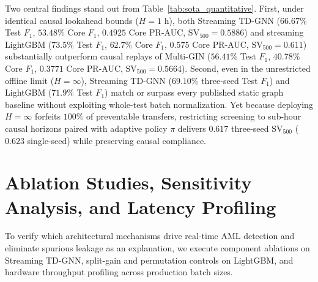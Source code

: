 \documentclass[pdflatex,sn-mathphys,Numbered]{sn-jnl}
\theoremstyle{thmstyleone}
\begin{document}
Two central findings stand out from Table~\ref{tab:sota_quantitative}. First, under identical causal lookahead bounds ($H = 1\text{ h}$), both Streaming TD-GNN ($66.67\%$ Test $F_1$, $53.48\%$ Core $F_1$, $0.4925$ Core PR-AUC, $\text{SV}_{500} = 0.5886$) and streaming LightGBM ($73.5\%$ Test $F_1$, $62.7\%$ Core $F_1$, $0.575$ Core PR-AUC, $\text{SV}_{500} = 0.611$) substantially outperform causal replays of Multi-GIN ($56.41\%$ Test $F_1$, $40.78\%$ Core $F_1$, $0.3771$ Core PR-AUC, $\text{SV}_{500} = 0.5664$). Second, even in the unrestricted offline limit ($H = \infty$), Streaming TD-GNN ($69.10\%$ three-seed Test $F_1$) and LightGBM ($71.9\%$ Test $F_1$) match or surpass every published static graph baseline without exploiting whole-test batch normalization. Yet because deploying $H = \infty$ forfeits $100\%$ of preventable transfers, restricting screening to sub-hour causal horizons paired with adaptive policy $\pi$ delivers $0.617$ three-seed $\text{SV}_{500}$ ($0.623$ single-seed) while preserving causal compliance.

\section{Ablation Studies, Sensitivity Analysis, and Latency Profiling}\label{sec:ablations}

To verify which architectural mechanisms drive real-time AML detection and eliminate spurious leakage as an explanation, we execute component ablations on Streaming TD-GNN, split-gain and permutation controls on LightGBM, and hardware throughput profiling across production batch sizes.
\end{document}
